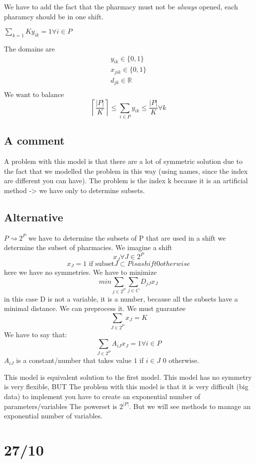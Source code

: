 \documentclass{scrartcl}
\newcommand{\ceiling}[1]{\ensuremath{\left\lceil#1\right\rceil}}
\begin{document}
We have to add the fact that the pharmacy must not be \emph{always} opened, each pharamcy
should be in one shift.

$\sum_{k=1}{K} y_{ik} = 1 \forall i \in P $


The domains are
$$
\begin{array}{l}
	y_{ik} \in \{0,1\} \\
	x_{jik} \in \{0,1\} \\
	d_{jk} \in \mathbb{R} \\ %
\end{array}
$$
We want to balance 
$$
\ceiling{\frac{|P|}{K}} \leq \sum_{i\in P} y_{ik} \leq \frac{|P|}{K} \forall k
$$
\subsection{A comment}
A problem with this model is that there are a lot of symmetric solution due
to the fact that we modelled the problem in this way (using names, since the index
are different you can have). The problem is the index k because it is an artificial
method -> we have only to determine subsets.
\subsection{Alternative}
$P \rightsquigarrow 2^P$ we have to determine the subsets of P that are used in a shift
we determine the subset of pharmacies.
We imagine a shift
$$
x_J  \forall J \in 2^P
$$
$$
x_J = 1 \mbox{ if subset} J \subset P is a shift
0 otherwise 
$$
here we have no symmetries.
We have to minimize
$$
min \sum_{j \in 2^P}\sum_{j \in C} D_{jJ} x_J
$$
in this case D is not a variable, it is a number, because
all the subsets have a minimal distance. We can 
preprocess it.
We must guarantee
$$
\sum_{J \in 2^P} x_J = K
$$
We have to say that:
$$
\sum_{J \in 2^P} A_{iJ} x_J = 1 \forall i \in P
$$
$A_{iJ}$ is a constant/number that takes value $1$ if $i \in J$ $0$ otherwise.


This model is equivalent solution to the first model.
This model has no symmetry is very flexible, BUT
The problem with this model is that it is very difficult (big data)
to implement you have to create an exponential number of parameters/variables
The powerset is $2^{|P|}$.
But we will see methods to manage an exponential number of variables.


\section{27/10}
\end{document}

